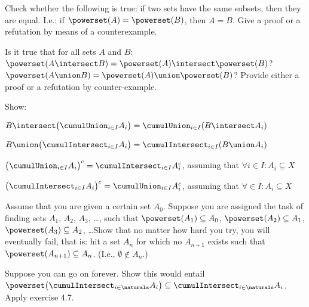 \begin{Exercise} [number=31]
Check whether the following is true: if two sets have the same subsets, then they are equal. I.e.: if $\powerset(A) = \powerset(B)$, then $A = B$. Give a proof or a refutation by means of a counterexample.
\end{Exercise}

\begin{Exercise} [number=32]
Is it true that for all sets $A$ and $B$:
\Question $\powerset(A \intersect B) = \powerset(A) \intersect \powerset(B)$?
\Question $\powerset(A \union B) = \powerset(A) \union \powerset(B)$?
\ExeText Provide either a proof or a refutation by counter-example.
\end{Exercise}

\begin{Exercise} [number=33, difficulty=1]
  Show: 

  \Question $B \intersect \bigl( \cumulUnion_{i \in I} A_i
  \bigr) = \cumulUnion_{i \in I}(B \intersect A_i)$
  
  \Question $B \union \bigl( \cumulIntersect_{i \in I} A_i \bigr) =
  \cumulIntersect_{i \in I}(B \union A_i)$
  
  \Question $\bigl(\cumulUnion_{i \in I} A_i \bigr)^c =
  \cumulIntersect_{i \in I} A_{i}^{c}$, assuming that $\forall{i} \in
  I \colon A_i \subseteq X$

  \Question $\bigl(\cumulIntersect_{i \in I} A_i \bigr)^c =
  \cumulUnion_{i \in I} A_{i}^{c}$, assuming that $\forall \in I
  \colon A_i \subseteq X$
\end{Exercise}

\begin{Exercise} [number=34, difficulty=1]
  Assume that you are given a certain set $A_0$. Suppose you are
  assigned the task of finding sets $A_1$, $A_2$, $A_3$, \dots, such
  that $\powerset(A_1) \subseteq A_0$, $\powerset(A_2) \subseteq A_1$,
  $\powerset(A_3) \subseteq A_2$, \dots Show that no matter how hard
  you try, you will eventually fail, that is: hit a set $A_n$ for
  which no $A_{n+1}$ exists such that $\powerset(A_{n+1}) \subseteq
  A_n$. (I.e., $\emptyset \notin A_n$.)

  \ExeText Suppose you can go on forever. Show this would entail
  $\powerset\bigl(\cumulIntersect_{i \in \naturals} A_i \bigr)
  \subseteq \cumulIntersect_{i \in \naturals} A_i$. Apply exercise 4.7.
\end{Exercise}

